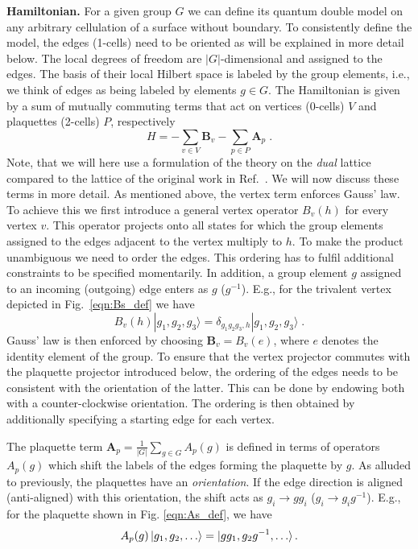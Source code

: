 \documentclass[a4paper,twocolumn,11pt, accepted=2024-06-14]{quantumarticle}
\begin{document}
\textbf{Hamiltonian.}
For a given group $G$ we can define its quantum double model on any arbitrary cellulation of a surface without boundary. To consistently define the model, the edges (1-cells) need to be oriented as will be explained in more detail below. The local degrees of freedom are $|G|$-dimensional and assigned to the edges. The basis of their local Hilbert space is labeled by the group elements, i.e., we think of edges as being labeled by elements $g\in G$. The Hamiltonian is given by a sum of mutually commuting terms that act on vertices (0-cells) $V$ and plaquettes (2-cells) $P$, respectively
\begin{equation}
    H = -  \sum_{v \in V} \mathbf B_v -  \sum_{p  \in  P} \mathbf A_p \label{eqn:ham} \;.
\end{equation}
Note, that we will here use a formulation of the theory on the \emph{dual} lattice compared to the lattice of the original work in Ref.~\cite{Kitaev_2003}.
We will now discuss these terms in more detail. As mentioned above, the vertex term enforces Gauss' law. To achieve this we first introduce a general vertex operator $B_v{(h)}$ for every vertex $v$. This operator projects onto all states for which the group elements assigned to the edges adjacent to the vertex multiply to $h$. To make the product unambiguous we need to order the edges. This ordering has to fulfil additional constraints to be specified momentarily. In addition, a group element $g$ assigned to an incoming (outgoing) edge enters as $g$ ($g^{-1}$). E.g., for the trivalent vertex depicted in Fig.~\ref{eqn:Bs_def} we have 
\begin{equation}
B_v{(h)} |g_1,g_2,g_3\rangle= \delta_{g_1 g_2 g_3,h} |g_1,g_2,g_3\rangle \;.	
\end{equation}
Gauss' law is then enforced by choosing $\mathbf B_v=B_v{(e)}$, where $e$ denotes the identity element of the group. To ensure that the vertex projector commutes with the plaquette projector introduced below, the ordering of the edges needs to be consistent with the orientation of the latter. This can be done by endowing both with a counter-clockwise orientation. The ordering is then obtained by additionally specifying a starting edge for each vertex.

The plaquette term 
	$\mathbf A_p=\frac{1}{|G|} \sum_{g \in G} A_p{(g)}$
is defined in terms of operators $A_p{(g)}$ which shift the labels of the edges forming the plaquette by $g$. As alluded to previously, the plaquettes have an \emph{orientation}. If the edge direction is aligned (anti-aligned) with this orientation, the shift acts as $g_i \rightarrow gg_i$ ($g_i \rightarrow g_ig^{-1}$). E.g., for the plaquette shown in Fig. \ref{eqn:As_def}, we have 
\begin{equation}
	A_p{(g)}\ket{g_1, g_2, \ldots} = \ket{gg_1, g_2g^{-1}, \ldots}.
\end{equation} 
\end{document}
